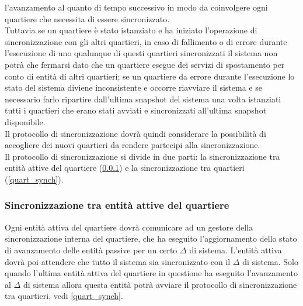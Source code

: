 l'avanzamento al quanto di tempo successivo in modo da coinvolgere ogni
quartiere che necessita di essere sincronizzato.\\
Tuttavia se un quartiere è stato istanziato e ha iniziato l'operazione di
sincronizzazione con gli altri quartieri, in caso di fallimento o di errore
durante l'esecuzione di uno qualunque di questi quartieri sincronizzati il
sistema non potrà che fermarsi dato che un quartiere esegue dei servizi di
spostamento per conto di entità di altri quartieri; se un quartiere da errore
durante l'esecuzione lo stato del sistema diviene inconsistente e occorre
riavviare il sistema e se necessario farlo ripartire dall'ultima snapshot del
sistema una volta istanziati tutti i quartieri che erano stati avviati e
sincronizzati all'ultima snapshot disponibile.\\
Il protocollo di sincronizzazione dovrà quindi considerare la possibilità di
accogliere dei nuovi quartieri da rendere partecipi alla sincronizzazione.\\
Il protocollo di sincronizzazione si divide in due parti: la sincronizzazione
tra entità attive del quartiere (\ref{int_synch}) e la sincronizzazione tra
quartieri (\ref{quart_synch}).
\subsubsection{Sincronizzazione tra entità attive del quartiere}
\label{int_synch}
Ogni entità attiva del quartiere dovrà comunicare ad un gestore della
sincronizzazione interna del quartiere, che ha eseguito l'aggiornamento dello
stato di avanzamento delle entità passive per un certo $\Delta$ di sistema.
L'entità attiva dovrà poi attendere che tutto il sistema sia sincronizzato con
il $\Delta$ di sistema. Solo quando l'ultima entità attiva del quartiere in
questione ha eseguito l'avanzamento al $\Delta$ di sistema allora questa entità
potrà avviare il protocollo di sincronizzazione tra quartieri, vedi
\ref{quart_synch}.


